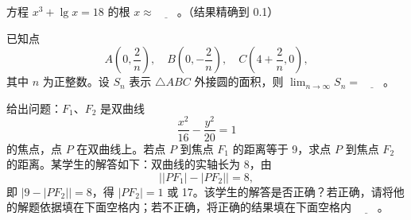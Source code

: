 \begin{question}
方程 \(x^3+\lg x=18\) 的根 \(x\approx\underline{\qquad}\)。（结果精确到 0.1）

\end{question}
\begin{question}
已知点
\nopagebreak[4]
\[
    A\left(0,\frac{2}{n}\right),\quad B\left(0,-\frac{2}{n}\right),\quad C\left(4+\frac{2}{n},0\right),
\]
    其中 \(n\) 为正整数。设 \(S_n\) 表示 \(\triangle ABC\) 外接圆的面积，则 \(\lim_{n\to\infty}S_n=\underline{\qquad}\)。

\end{question}
\begin{question}
给出问题：\(F_1、F_2\) 是双曲线
\nopagebreak[4]
\[
    \frac{x^2}{16}-\frac{y^2}{20}=1
\]
    的焦点，点 \(P\) 在双曲线上。若点 \(P\) 到焦点 \(F_1\) 的距离等于 9，求点 \(P\) 到焦点 \(F_2\) 的距离。某学生的解答如下：双曲线的实轴长为 8，由
\nopagebreak[4]
\[
    \bigl||PF_1|-|PF_2|\bigr|=8,
\]
    即 \(|9-|PF_2||=8\)，得 \(|PF_2|=1\) 或 17。该学生的解答是否正确？若正确，请将他的解题依据填在下面空格内；若不正确，将正确的结果填在下面空格内 \(\underline{\qquad}\)。

\end{question}

